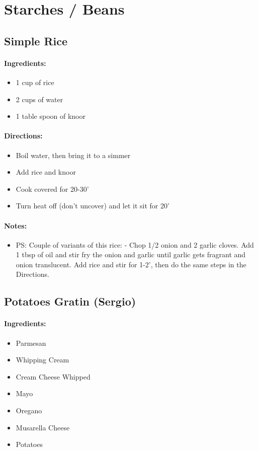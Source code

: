 \documentclass{article}
\begin{document}
\section{Starches / Beans}


\subsection{Simple Rice}

\paragraph{Ingredients:}
\begin{itemize}
    \item 1 cup of rice
    \item 2 cups of water
    \item 1 table spoon of knoor
\end{itemize}

\paragraph{Directions:}
\begin{itemize}
    \item Boil water, then bring it to a simmer
    \item Add rice and knoor
    \item Cook covered for 20-30'
    \item Turn heat off (don't uncover) and let it sit for 20'
\end{itemize}

\paragraph{Notes:}
\begin{itemize}
    \item PS: Couple of variants of this rice: - Chop 1/2 onion and 2 garlic cloves. Add 1 tbsp of oil and stir fry the onion and garlic until garlic gets fragrant and onion translucent. Add rice and stir for 1-2’, then do the same steps in the Directions.
\end{itemize}

\subsection{Potatoes Gratin (Sergio)}

\paragraph{Ingredients:}
\begin{itemize}
    \item Parmesan
    \item Whipping Cream
    \item Cream Cheese Whipped
    \item Mayo
    \item Oregano
    \item Musarella Cheese
    \item Potatoes
\end{itemize}
\end{document}

